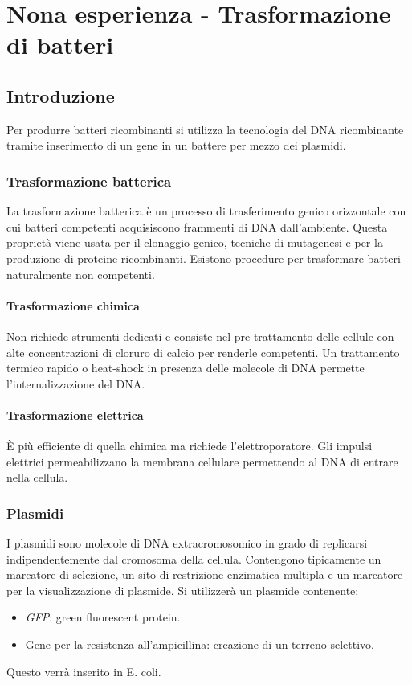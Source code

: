 \section{Nona esperienza - Trasformazione di batteri}

	\subsection{Introduzione}
	Per produrre batteri ricombinanti si utilizza la tecnologia del DNA ricombinante tramite inserimento di un gene in un battere per mezzo dei plasmidi.

		\subsubsection{Trasformazione batterica}
		La trasformazione batterica \`e un processo di trasferimento genico orizzontale con cui batteri competenti acquisiscono frammenti di DNA dall'ambiente.
		Questa propriet\`a viene usata per il clonaggio genico, tecniche di mutagenesi e per la produzione di proteine ricombinanti.
		Esistono procedure per trasformare batteri naturalmente non competenti.

			\paragraph{Trasformazione chimica}
			Non richiede strumenti dedicati e consiste nel pre-trattamento delle cellule con alte concentrazioni di cloruro di calcio per renderle competenti.
			Un trattamento termico rapido o heat-shock in presenza delle molecole di DNA permette l'internalizzazione del DNA.

			\paragraph{Trasformazione elettrica}
			\`E pi\`u efficiente di quella chimica ma richiede l'elettroporatore.
			Gli impulsi elettrici permeabilizzano la membrana cellulare permettendo al DNA di entrare nella cellula.

		\subsubsection{Plasmidi}
		I plasmidi sono molecole di DNA extracromosomico in grado di replicarsi indipendentemente dal cromosoma della cellula.
		Contengono tipicamente un marcatore di selezione, un sito di restrizione enzimatica multipla e un marcatore per la visualizzazione di plasmide.
		Si utilizzer\`a un plasmide contenente:
		\begin{multicols}{2}
			\begin{itemize}
				\item \emph{GFP}: green fluorescent protein.
				\item Gene per la resistenza all'ampicillina: creazione di un terreno selettivo.
			\end{itemize}
		\end{multicols}
		Questo verr\`a inserito in E. coli.

